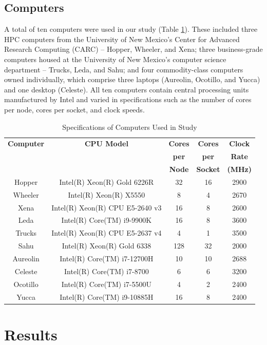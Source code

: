 \documentclass{article}
\begin{document}
\subsection{Computers}
A total of ten computers were used in our study (Table \ref{table:computers}). These included three HPC computers from the University of New Mexico's Center for Advanced Research Computing (CARC) – Hopper, Wheeler, and Xena; three business-grade computers housed at the University of New Mexico’s computer science department – Trucks, Leda, and Sahu; and four commodity-class computers owned individually, which comprise three laptops (Aureolin, Ocotillo, and Yucca) and one desktop (Celeste). All ten computers contain central processing units manufactured by Intel and varied in specifications such as the number of cores per node, cores per socket, and clock speeds.
\begin{table}[h!]
\centering
\begin{tabular}{|c|c|c|c|c|}
\hline
\textbf{Computer} & \textbf{CPU Model} & \textbf{Cores} & \textbf{Cores} & \textbf{Clock} \\
 & & \textbf{per} & \textbf{per} & \textbf{Rate} \\
 & & \textbf{Node} & \textbf{Socket} & \textbf{(MHz)} \\
\hline
Hopper & Intel(R) Xeon(R) Gold 6226R & 32 & 16 & 2900 \\
Wheeler & Intel(R) Xeon(R) X5550 & 8 & 4 & 2670 \\
Xena & Intel(R) Xeon(R) CPU E5-2640 v3 & 16 & 8 & 2600 \\
\hline
Leda & Intel(R) Core(TM) i9-9900K & 16 & 8 & 3600 \\
Trucks & Intel(R) Xeon(R) CPU E5-2637 v4 & 4 & 1 & 3500 \\
Sahu & Intel(R) Xeon(R) Gold 6338 & 128 & 32 & 2000 \\
\hline
Aureolin & Intel(R) Core(TM) i7-12700H & 10 & 10 & 2688 \\
Celeste & Intel(R) Core(TM) i7-8700 & 6 & 6 & 3200 \\
Ocotillo & Intel(R) Core(TM) i7-5500U & 4 & 2 & 2400 \\
Yucca & Intel(R) Core(TM) i9-10885H & 16 & 8 & 2400 \\
\hline
\end{tabular}
\caption{Specifications of Computers Used in Study}
\label{table:computers}
\end{table}

\section{Results}
\end{document}
